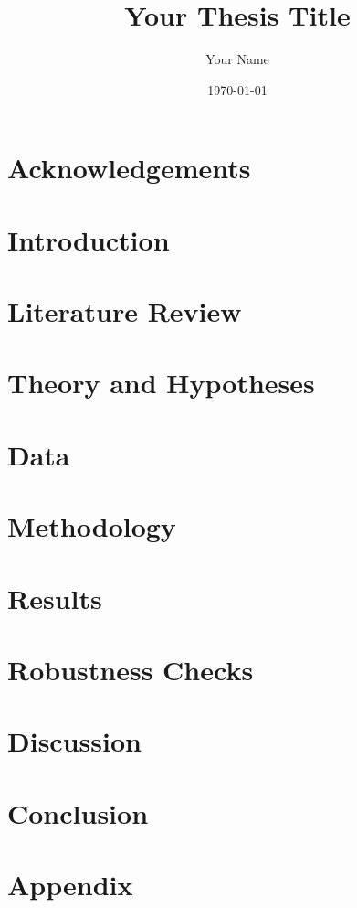 \documentclass[12pt,a4paper]{report}
\title{\textbf{Your Thesis Title}}
\author{Your Name}
\date{\today}
\begin{document}
\maketitle

\begin{abstract}
\end{abstract}

\chapter*{Acknowledgements}

\tableofcontents
\listoffigures
\listoftables

\chapter{Introduction}

\chapter{Literature Review}

\chapter{Theory and Hypotheses}

\chapter{Data}

\chapter{Methodology}

\chapter{Results}

\chapter{Robustness Checks}

\chapter{Discussion}

\chapter{Conclusion}

\printbibliography

\appendix
\chapter{Appendix}
\end{document}

